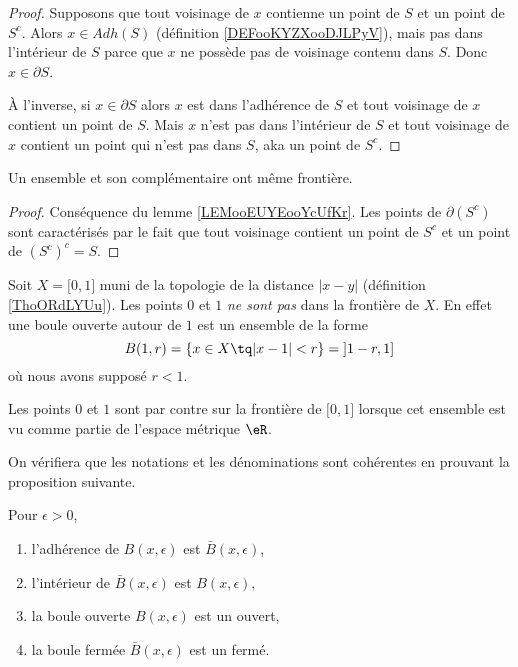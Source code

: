\begin{proof}
    Supposons que tout voisinage de \( x\) contienne un point de \( S\) et un point de \( S^c\). Alors \( x\in Adh(S)\) (définition \ref{DEFooKYZXooDJLPyV}), mais pas dans l'intérieur de \( S\) parce que \( x\) ne possède pas de voisinage contenu dans \( S\). Donc \( x\in \partial S\).

    À l'inverse, si \( x\in\partial S\) alors \( x\) est dans l'adhérence de \( S\) et tout voisinage de \( x\) contient un point de \( S\). Mais \( x\) n'est pas dans l'intérieur de \( S\) et tout voisinage de \( x\) contient un point qui n'est pas dans \( S\), aka un point de \( S^c\).
\end{proof}

\begin{corollary}
    Un ensemble et son complémentaire ont même frontière.
\end{corollary}

\begin{proof}
    Conséquence du lemme \ref{LEMooEUYEooYcUfKr}. Les points de \( \partial(S^c)\) sont caractérisés par le fait que tout voisinage contient un point de \( S^c\) et un point de \( (S^c)^c=S\).
\end{proof}

\begin{example}
    Soit \( X=\mathopen[ 0 , 1 \mathclose]\) muni de la topologie de la distance \( | x-y |\) (définition \ref{ThoORdLYUu}). Les points \( 0\) et \( 1\) \emph{ne sont pas} dans la frontière de $X$. En effet une boule ouverte autour de \( 1\) est un ensemble de la forme
    \begin{equation}
        B(1,r)=\{ x\in X\tq | x-1 |<r \}=\mathopen] 1-r , 1 \mathclose]
    \end{equation}
    où nous avons supposé \( r<1\).

    Les points \( 0\) et \( 1\) sont par contre sur la frontière de \( \mathopen[ 0 , 1 \mathclose]\) lorsque cet ensemble est vu comme partie de l'espace métrique \( \eR\).
\end{example}

On vérifiera que les notations et les dénominations sont cohérentes en prouvant la proposition suivante.
\begin{proposition}Pour $\epsilon > 0$,
  \begin{enumerate}
  \item l'adhérence de $B(x,\epsilon)$ est $\bar B(x,\epsilon)$,
  \item l'intérieur de $\bar B(x,\epsilon)$ est $B(x,\epsilon)$,
  \item la boule ouverte $B(x,\epsilon)$ est un ouvert,
  \item la boule fermée $\bar B(x,\epsilon)$ est un fermé.
  \end{enumerate}
\end{proposition}

